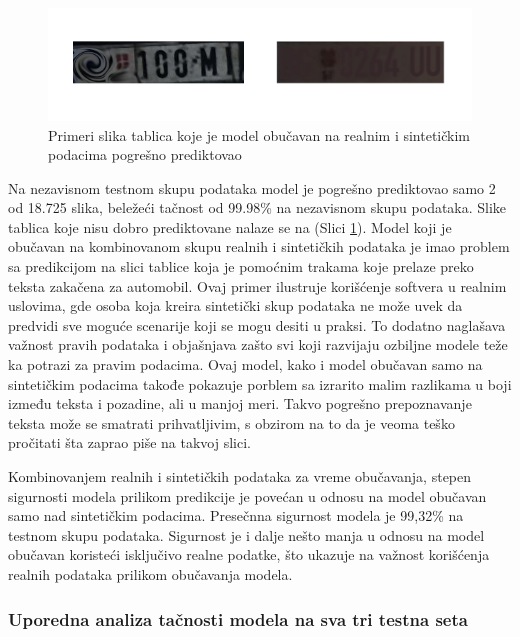\documentclass[a4paper,12pt]{article}
\begin{document}
	\begin{figure}[H]
		\centering
		\includegraphics[width=\textwidth]{assets/bad-predictions-real-and-synthetic-data-model.png}
		\caption{Primeri slika tablica koje je model obučavan na realnim i sintetičkim podacima pogrešno prediktovao}
		\label{fig:bad-predictions-real-and-synthetic-data-model}
	\end{figure}
	
	Na nezavisnom testnom skupu podataka model je pogrešno prediktovao samo 2 od 18.725 slika, beležeći tačnost od 99.98\% na nezavisnom skupu podataka. Slike tablica koje nisu dobro prediktovane nalaze se na (Slici \ref{fig:bad-predictions-real-and-synthetic-data-model}). Model koji je obučavan na kombinovanom skupu realnih i sintetičkih podataka je imao problem sa predikcijom na slici tablice koja je pomoćnim trakama koje prelaze preko teksta zakačena za automobil. Ovaj primer ilustruje korišćenje softvera u realnim uslovima, gde osoba koja kreira sintetički skup podataka ne može uvek da predvidi sve moguće scenarije koji se mogu desiti u praksi. To dodatno naglašava važnost pravih podataka i objašnjava zašto svi koji razvijaju ozbiljne modele teže ka potrazi za pravim podacima. Ovaj model, kako i model obučavan samo na sintetičkim podacima takođe pokazuje porblem sa izrarito malim razlikama u boji između teksta i pozadine, ali u manjoj meri. Takvo pogrešno prepoznavanje teksta može se smatrati prihvatljivim, s obzirom na to da je veoma teško pročitati šta zaprao piše na takvoj slici.
	
	Kombinovanjem realnih i sintetičkih podataka za vreme obučavanja, stepen sigurnosti modela prilikom predikcije je povećan u odnosu na model obučavan samo nad sintetičkim podacima. Presečnna sigurnost modela je 99,32\% na testnom skupu podataka. Sigurnost je i dalje nešto manja u odnosu na model obučavan koristeći isključivo realne podatke, što ukazuje na važnost korišćenja realnih podataka prilikom obučavanja modela.
	
	\subsubsection{Uporedna analiza tačnosti modela na sva tri testna seta}
	
\end{document}
